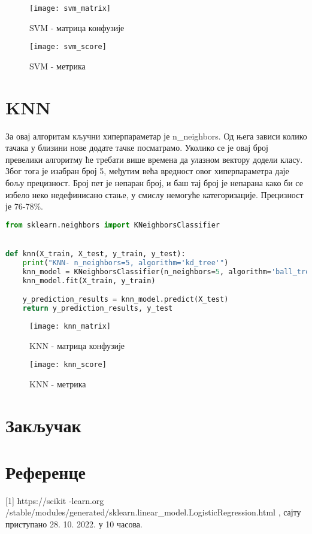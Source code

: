 \documentclass[11pt]{article} %
\begin{document}
\begin{figure}[h]
\centering
	\texttt{[image: svm\_matrix]} 
	\caption{SVM - матрица конфузије} 
\end{figure}

\begin{figure}[h]
\centering
	\texttt{[image: svm\_score]} 
	\caption{SVM - метрика} 
\end{figure}



\section{KNN}
За овај алгоритам кључни хиперпараметар је n\_neighbors. Од њега зависи колико тачака у близини нове додате тачке посматрамо. Уколико се је овај број превелики алгоритму ће требати више времена да улазном вектору додели класу. Због тога је изабран број 5, међутим већа вредност овог хиперпараметра даје бољу прецизност. Број пет је непаран број, и баш тај број је непарана како би се избело неко недефинисано стање, у смислу немогуће категоризације.
	Прецизност је 76-78\%.
	
\begin{lstlisting}[language=Python,title=Пример 9. KNN /classificators/k\_nearest\_n.py ]
from sklearn.neighbors import KNeighborsClassifier


def knn(X_train, X_test, y_train, y_test):
    print("KNN- n_neighbors=5, algorithm='kd_tree'")
    knn_model = KNeighborsClassifier(n_neighbors=5, algorithm='ball_tree', p=2) # algorithm='ball_tree')
    knn_model.fit(X_train, y_train)

    y_prediction_results = knn_model.predict(X_test)
    return y_prediction_results, y_test
\end{lstlisting}

\begin{figure}[h]
\centering
	\texttt{[image: knn\_matrix]} 
	\caption{KNN - матрица конфузије} 
\end{figure}

\begin{figure}[h]
\centering
	\texttt{[image: knn\_score]} 
	\caption{KNN - метрика} 
\end{figure}


\section{Закључак}
\newpage
\section{Референце}
[1] https://scikit -learn.org /stable/modules/generated/sklearn.linear_model.LogisticRegression.html , сајту приступано 28. 10. 2022. у 10 часова.
\end{document}
